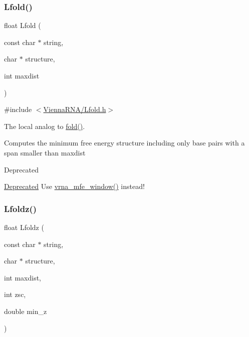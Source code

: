 \subsubsection{\texorpdfstring{Lfold()}{Lfold()}}
{\footnotesize\ttfamily float Lfold (\begin{DoxyParamCaption}\item[{const char $\ast$}]{string,  }\item[{char $\ast$}]{structure,  }\item[{int}]{maxdist }\end{DoxyParamCaption})}



{\ttfamily \#include $<$\hyperlink{Lfold_8h}{Vienna\+R\+N\+A/\+Lfold.\+h}$>$}



The local analog to \hyperlink{group__mfe__fold__single_gaadafcb0f140795ae62e5ca027e335a9b}{fold()}. 

Computes the minimum free energy structure including only base pairs with a span smaller than \textquotesingle{}maxdist\textquotesingle{}

\begin{DoxyRefDesc}{Deprecated}
\item[\hyperlink{deprecated__deprecated000088}{Deprecated}]Use \hyperlink{group__local__mfe__fold_ga689df235a1915a1ad56e377383c044ce}{vrna\+\_\+mfe\+\_\+window()} instead! \end{DoxyRefDesc}
\mbox{\label{group__local__mfe__fold_gab6d79eecc180f586679f7b85cce5cbe9}} 
\subsubsection{\texorpdfstring{Lfoldz()}{Lfoldz()}}
{\footnotesize\ttfamily float Lfoldz (\begin{DoxyParamCaption}\item[{const char $\ast$}]{string,  }\item[{char $\ast$}]{structure,  }\item[{int}]{maxdist,  }\item[{int}]{zsc,  }\item[{double}]{min\+\_\+z }\end{DoxyParamCaption})}



